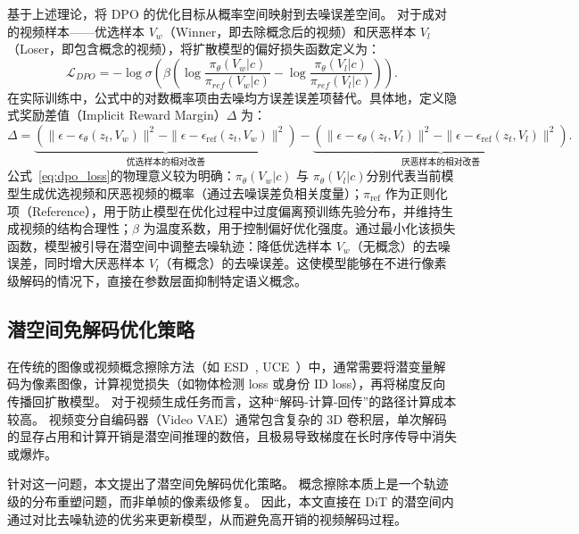 基于上述理论，将 DPO 的优化目标从概率空间映射到去噪误差空间。
对于成对的视频样本——优选样本 $V_w$（Winner，即去除概念后的视频）和厌恶样本 $V_l$（Loser，即包含概念的视频），将扩散模型的偏好损失函数定义为：
\begin{equation}\label{eq:dpo_loss}
\mathcal{L}_{DPO} = -\log \sigma \left( \beta \left( \log \frac{\pi_\theta(V_w|c)}{\pi_{ref}(V_w|c)} - \log \frac{\pi_\theta(V_l|c)}{\pi_{ref}(V_l|c)} \right) \right).
\end{equation}
在实际训练中，公式中的对数概率项由去噪均方误差误差项替代。具体地，定义隐式奖励差值（Implicit Reward Margin）$\Delta$ 为：
\begin{equation}\label{eq:implicit_reward_margin}
\Delta = \underbrace{\left( \| \epsilon - \epsilon_\theta(z_t, V_w) \|^2 - \| \epsilon - \epsilon_{\text{ref}}(z_t, V_w) \|^2 \right)}_{\text{优选样本的相对改善}} - \underbrace{\left( \| \epsilon - \epsilon_\theta(z_t, V_l) \|^2 - \| \epsilon - \epsilon_{\text{ref}}(z_t, V_l) \|^2 \right)}_{\text{厌恶样本的相对改善}}.
\end{equation}
公式~\ref{eq:dpo_loss}的物理意义较为明确：$\pi_\theta(V_w|c)$ 与 $\pi_\theta(V_l|c)$分别代表当前模型生成优选视频和厌恶视频的概率（通过去噪误差负相关度量）；$\pi_{\text{ref}}$ 作为正则化项（Reference），用于防止模型在优化过程中过度偏离预训练先验分布，并维持生成视频的结构合理性；$\beta$ 为温度系数，用于控制偏好优化强度。通过最小化该损失函数，模型被引导在潜空间中调整去噪轨迹：降低优选样本 $V_w$（无概念）的去噪误差，同时增大厌恶样本 $V_l$（有概念）的去噪误差。这使模型能够在不进行像素级解码的情况下，直接在参数层面抑制特定语义概念。~\cite{wallace2024diffusion}

\subsection{潜空间免解码优化策略}\label{subsec:free_form_optimization}

在传统的图像或视频概念擦除方法（如 ESD~\cite{gandikota2023erasing}, UCE~\cite{Gandikota2023UnifiedCE}）中，通常需要将潜变量解码为像素图像，计算视觉损失（如物体检测 loss 或身份 ID loss），再将梯度反向传播回扩散模型。
对于视频生成任务而言，这种“解码-计算-回传”的路径计算成本较高。
视频变分自编码器（Video VAE）通常包含复杂的 3D 卷积层，单次解码的显存占用和计算开销是潜空间推理的数倍，且极易导致梯度在长时序传导中消失或爆炸。

针对这一问题，本文提出了潜空间免解码优化策略。
概念擦除本质上是一个轨迹级的分布重塑问题，而非单帧的像素级修复。
因此，本文直接在 DiT 的潜空间内通过对比去噪轨迹的优劣来更新模型，从而避免高开销的视频解码过程。


